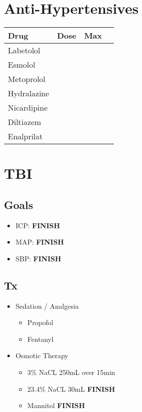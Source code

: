 \documentclass[8pt,twoside]{extarticle}
\newcommand{\finish}{\textbf{\color{red} FINISH}}
\begin{document}
\newpage

\section{Anti-Hypertensives}
\begin{table}[h!]
\centering
\begin{tabular}{l l l l}
	\textbf{Drug} & \textbf{Dose} & \textbf{Max} \\ \hline
	Labetolol & & \\
	Esmolol & & \\
	Metoprolol & & \\
	Hydralazine & & \\
	Nicardipine & & \\
	Diltiazem & & \\
	Enalprilat & & \\
\end{tabular}
\end{table}

\newpage

\section{TBI}

\subsection*{Goals}
\begin{itemize}[noitemsep]
	\item ICP: \finish
	\item MAP: \finish
	\item SBP: \finish
\end{itemize}

\subsection*{Tx}
\begin{itemize}[noitemsep]
	\item Sedation / Analgesia
	\begin{itemize}[noitemsep]
		\item Propofol
		\item Fentanyl
	\end{itemize}
	\item Osmotic Therapy
	\begin{itemize}[noitemsep]
		\item 3\% NaCL 250mL over 15min
		\item 23.4\% NaCL 30mL \finish
		\item Mannitol \finish
	\end{itemize}
\end{itemize}
\end{document}
